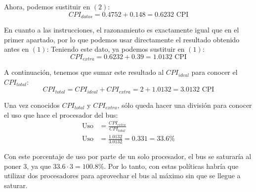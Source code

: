 \documentclass[12pt,a4paper]{article}
\begin{document}
Ahora, podemos sustituir en $(2)$:
\begin{equation*}
CPI_{datos}=0.4752+0.148=0.6232\text{ CPI}
\end{equation*}

En cuanto a las instrucciones, el razonamiento es exactamente igual que en el primer apartado, por lo que podemos usar directamente el resultado obtenido antes en $(1)$:
Teniendo este dato, ya podemos sustituir en $(1)$:
\begin{equation*}
CPI_{extra}=0.6232+0.39=1.0132\text{ CPI}
\end{equation*}

A continuación, tenemos que sumar este resultado al $CPI_{ideal}$ para conocer el $CPI_{total}$:
\begin{equation*}
CPI_{total}=CPI_{ideal}+CPI_{extra}=2+1.0132=3.0132\text{ CPI}
\end{equation*}

Una vez conocidos $CPI_{total}$ y $CPI_{extra}$, sólo queda hacer una división para conocer el uso que hace el procesador del bus:
\begin{align*}
\text{Uso}&=\frac{CPI_{extra}}{CPI_{total}}\\
\text{Uso}&=\frac{1.0132}{3.0132} = 0.331 = 33.6\%
\end{align*}

Con este porcentaje de uso por parte de un solo procesador, el bus se saturaría al poner 3, ya que $33.6\cdot 3=100.8\%$. Por lo tanto, con estas políticas habría que utilizar dos procesadores para aprovechar el bus al máximo sin que se llegue a saturar.



\end{document}
